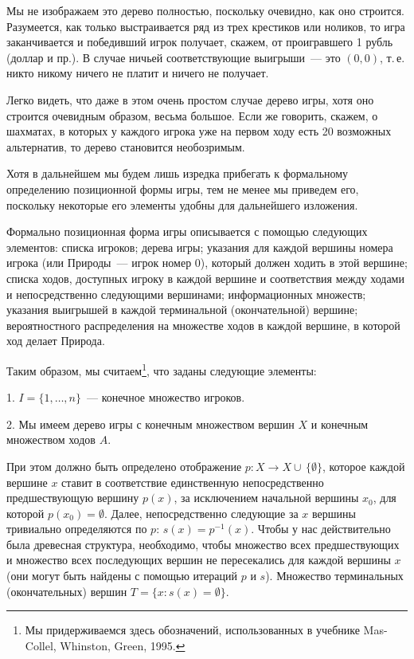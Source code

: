 \documentclass[12pt]{article}
\begin{document}
Мы не изображаем это дерево полностью, поскольку очевидно, как оно
строится. Разумеется, как только выстраивается ряд из трех крестиков
или ноликов, то игра заканчивается и победивший игрок получает,
скажем, от проигравшего 1 рубль (доллар и пр.). В случае ничьей
соответствующие выигрыши~--- это $(0,0)$, т.\,е. никто никому ничего
не платит и ничего не получает.

Легко видеть, что даже в этом очень простом случае дерево игры,
хотя оно строится очевидным образом, весьма большое. Если же говорить,
скажем, о шахматах, в которых у каждого игрока уже на первом ходу
есть 20 возможных альтернатив, то дерево становится необозримым.

Хотя в дальнейшем мы будем лишь изредка прибегать к формальному
определению позиционной формы игры, тем не менее мы приведем его,
поскольку некоторые его элементы удобны для дальнейшего изложения.

Формально позиционная форма игры описывается с помощью следующих
элементов: списка игроков; дерева игры; указания для каждой вершины
номера игрока (или Природы~--- игрок номер $0$), который должен
ходить в этой вершине; списка ходов, доступных игроку в каждой
вершине и соответствия между ходами и непосредственно следующими
вершинами; информационных множеств; указания выигрышей в каждой
терминальной (окончательной) вершине; вероятностного распределения
на множестве ходов в каждой вершине, в которой ход  делает Природа.

Таким образом, мы считаем\footnote{ Мы придерживаемся здесь
обозначений, использованных в учебнике Mas-Collel, Whinston,
Green, 1995.}, что заданы следующие элементы:

1. $I=\{1,\ldots,n\}$~--- конечное множество игроков.

2. Мы имеем дерево игры с конечным множеством вершин $X$  и конечным
множеством ходов $A$.

При этом должно быть определено отображение $p:X\to
X\cup\,\{\emptyset\}$, которое каждой вершине $x$ ставит в
соответствие единственную непосредственно предшествующую  вершину
$p(x)$, за исключением начальной вершины $x_0$, для которой
$p(x_0)=\emptyset$. Далее, непосредственно следующие за $x$ вершины
тривиально определяются по $p$: $s(x)=p^{-1}(x)$. Чтобы у нас
действительно была древесная структура, необходимо, чтобы множество
всех предшествующих и множество всех последующих  вершин не
пересекались для каждой вершины $x$ (они могут быть найдены с
помощью итераций $p$ и $s$). Множество терминальных (окончательных)
вершин $T=\{x:s(x)=\emptyset\}$.
\end{document}
